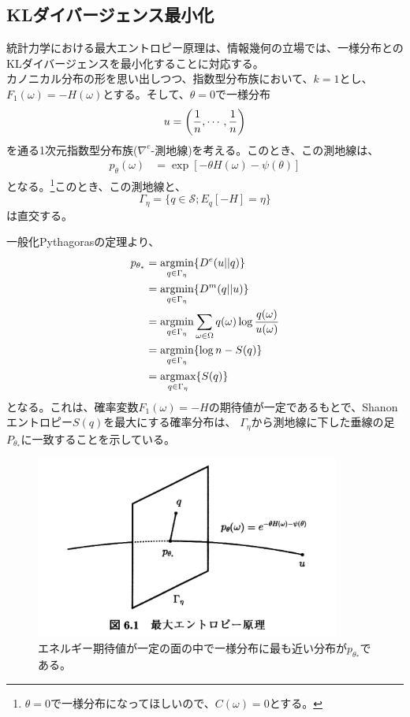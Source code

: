 \documentclass[a4paper,11pt]{jsarticle}
\numberwithin{equation}{section}
\begin{document}
\subsection{KLダイバージェンス最小化}
統計力学における最大エントロピー原理は、情報幾何の立場では、一様分布とのKLダイバージェンスを最小化することに対応する。\\

カノニカル分布の形を思い出しつつ、指数型分布族において、$k=1$とし、$F_1(\omega) = -H(\omega)$とする。そして、$\theta = 0$で一様分布
\begin{equation}
    u = \qty(\frac{1}{n},\cdots,\frac{1}{n})
\end{equation}
を通る1次元指数型分布族($\nabla^{e}$-測地線)を考える。このとき、この測地線は、
\begin{align}
    p_{\theta}(\omega) &= \exp\left[ -\theta H(\omega) - \psi(\theta) \right]
\end{align}
となる。\footnote{$\theta = 0$で一様分布になってほしいので、$C(\omega)=0$とする。}このとき、この測地線と、
\begin{equation}
    \Gamma_{\eta} = \{q \in \mathcal{S}; E_q[-H] = \eta \}
\end{equation}
は直交する。

一般化Pythagorasの定理より、
\begin{align}
    p_{\theta_*} &= \underset{q \in \Gamma_\eta}{\text{argmin}} \qty{D^e(u||q)} \\
    &= \underset{q \in \Gamma_\eta}{\text{argmin}} \qty{D^m(q||u)}\\
    &= \underset{q \in \Gamma_\eta}{\text{argmin}} \sum_{\omega \in \Omega} q(\omega) \log \frac{q(\omega)}{u(\omega)}\\
    &= \underset{q \in \Gamma_\eta}{\text{argmin}} \{\log n -S(q)\}\\
    &= \underset{q \in \Gamma_\eta}{\text{argmax}} \{S(q)\}
\end{align}
となる。これは、確率変数$F_1(\omega) = -H$の期待値が一定であるもとで、Shanonエントロピー$S(q)$を最大にする確率分布は、
$\Gamma_{\eta}$から測地線に下した垂線の足$P_{\theta_*}$に一致することを示している。

\begin{figure}[H]
    \begin{center}
    \includegraphics[width=100mm]{entropy.png}
    \end{center}
    \caption{エネルギー期待値が一定の面の中で一様分布に最も近い分布が$p_{\theta_*}$である。}
    \label{fig:one}
\end{figure}
\end{document}

